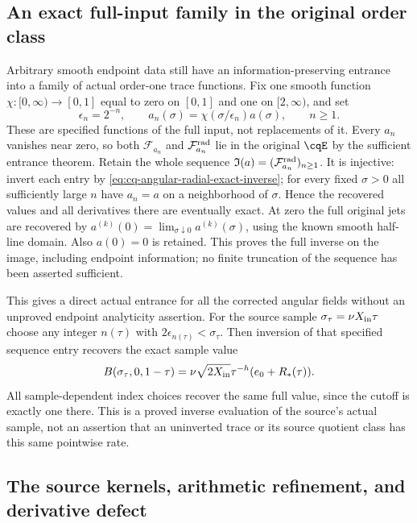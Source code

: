 \subsection{An exact full-input family in the original order class}

Arbitrary smooth endpoint data still have an information-preserving
entrance into a family of actual order-one trace functions.
Fix one smooth function $\chi:[0,\infty)\to[0,1]$ equal to zero
on $[0,1]$ and one on $[2,\infty)$, and set
\[
 \epsilon_n=2^{-n},\qquad a_n(\sigma)=\chi(\sigma/\epsilon_n)a(\sigma),
                  \qquad n\geq1.
\]
These are specified functions of the full input, not replacements
of it. Every $a_n$ vanishes near zero, so both $\mathcal F_{a_n}$
and $\mathcal F_{a_n}^{\rm rad}$ lie in the original $\cqE$ by
the sufficient entrance theorem. Retain the whole sequence
$\mathfrak I(a)=(\mathcal F_{a_n}^{\rm rad})_{n\geq1}$.
It is injective: invert each entry by
\eqref{eq:cq-angular-radial-exact-inverse}; for every fixed
$\sigma>0$ all sufficiently large $n$ have
$a_n=a$ on a neighborhood of $\sigma$. Hence the recovered
values and all derivatives there are eventually exact.
At zero the full original jets are recovered by
$a^{(k)}(0)=\lim_{\sigma\downarrow0}a^{(k)}(\sigma)$,
using the known smooth half-line domain. Also $a(0)=0$ is retained.
This proves the full inverse on the image, including endpoint
information; no finite truncation of the sequence has been
asserted sufficient.

This gives a direct actual entrance for all the corrected angular
fields without an unproved endpoint analyticity assertion.
For the source sample
$\sigma_\tau=\nu X_{\rm in}\tau$ choose any integer $n(\tau)$
with $2\epsilon_{n(\tau)}<\sigma_\tau$. Then inversion of that
specified sequence entry recovers the exact sample value
\[
 B(\sigma_\tau,0,1-\tau)
 =\nu\sqrt{2X_{\rm in}}\tau^{-h}(e_0+R_*(\tau)).
\]
All sample-dependent index choices recover the same full value,
since the cutoff is exactly one there. This is a proved inverse
evaluation of the source's actual sample, not an assertion that
an uninverted trace or its source quotient class has this same
pointwise rate.

\subsection{The source kernels, arithmetic refinement, and derivative defect}


